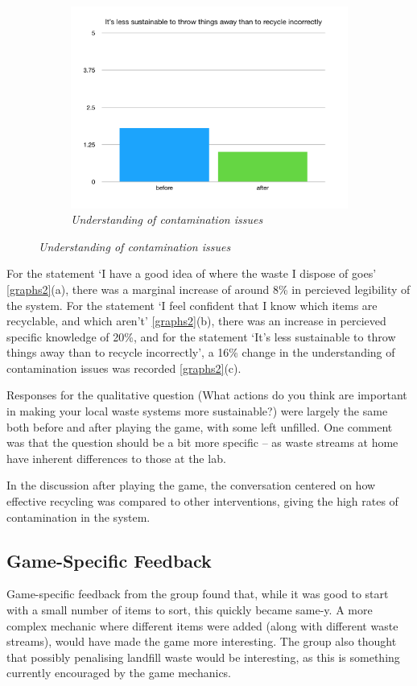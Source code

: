 \documentclass[nofonts,nols,justified,nobib]{tufte-book}
\begin{document}
\begin{figure}
  \centering
\begin{subfigure}{1\textwidth}
  \includegraphics[width=1\linewidth]{img/4/llk-contamination.png}
\caption{\textit{Understanding of contamination issues}}
\end{subfigure}
\end{figure}
\vspace{0.8cm}

For the statement `I have a good idea of where the waste I dispose of goes' \ref{graphs2}(a), there was a marginal increase of around 8\% in percieved legibility of the system. For the statement `I feel confident that I know which items are recyclable, and which aren't' \ref{graphs2}(b), there was an increase in percieved specific knowledge of 20\%, and for the statement `It's less sustainable to throw things away than to recycle incorrectly', a 16\% change in the understanding of contamination issues was recorded \ref{graphs2}(c). 

Responses for the qualitative question (What actions do you think are important in making your local waste systems more sustainable?) were largely the same both before and after playing the game, with some left unfilled. One comment was that the question should be a bit more specific -- as waste streams at home have inherent differences to those at the lab.

In the discussion after playing the game, the conversation centered on how effective recycling was compared to other interventions, giving the high rates of contamination in the system. 

\subsection*{Game-Specific Feedback}
Game-specific feedback from the group found that, while it was good to start with a small number of items to sort, this quickly became same-y. A more complex mechanic where different items were added (along with different waste streams), would have made the game more interesting. The group also thought that possibly penalising landfill waste would be interesting, as this is something currently encouraged by the game mechanics. 
\end{document}

